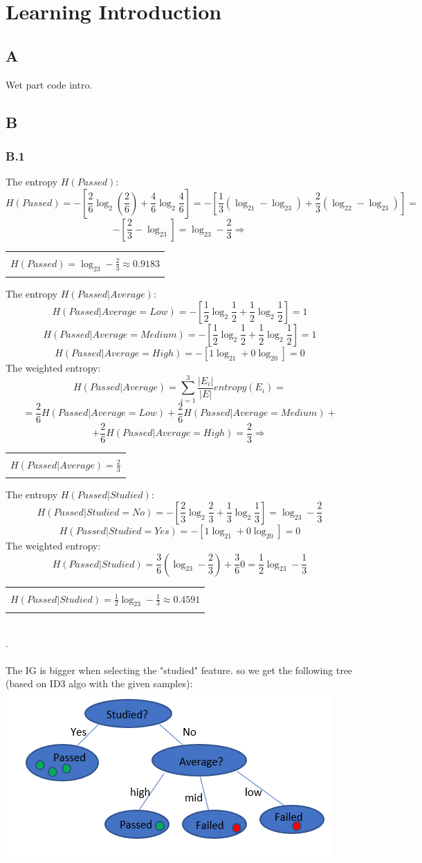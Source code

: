 \documentclass[12pt]{article}
\newcommand{\rectres}[1]{
\begin{center}
\begin{tabular}{ |c| }
\hline\\
#1\\
\\
\hline
\end{tabular}
\end{center}
}
\begin{document}
\section*{Learning Introduction}

\subsection*{A}
Wet part code intro.

\subsection*{B}
\subsubsection*{B.1}
The entropy $H(Passed)$:
$$H(Passed)= -[\frac{2}{6}\log_2(\frac{2}{6}) + \frac{4}{6}\log_2\frac{4}{6}] = -[\frac{1}{3}(\log_21- \log_23) + \frac{2}{3}(\log_22 - \log_23)]=$$ 
$$-[\frac{2}{3} - \log_23] = \log_23 - \frac{2}{3} \Rightarrow$$
\rectres{$H(Passed)=\log_23 - \frac{2}{3} \approx 0.9183$}
The entropy $H(Passed|Average)$:
$$H(Passed|Average=Low)= -[\frac{1}{2}\log_2\frac{1}{2} +\frac{1}{2}\log_2\frac{1}{2}] = 1$$ 
$$H(Passed|Average=Medium)= -[\frac{1}{2}\log_2\frac{1}{2} +\frac{1}{2}\log_2\frac{1}{2}] = 1$$ 
$$H(Passed|Average=High)= -[1\log_21 + 0\log_20] = 0$$ 
The weighted entropy:
$$H(Passed|Average)=\sum_{i=1}^3\frac{|E_i|}{|E|}entropy(E_i)=$$ $$=\frac{2}{6}H(Passed|Average=Low) + \frac{2}{6}H(Passed|Average=Medium)+$$
$$+\frac{2}{6}H(Passed|Average=High)=\frac{2}{3}\Rightarrow$$
\rectres{$H(Passed|Average)=\frac{2}{3}$}
The entropy $H(Passed|Studied)$:
$$H(Passed|Studied=No)= -[\frac{2}{3}\log_2\frac{2}{3} +\frac{1}{3}\log_2\frac{1}{3}] = \log_23 - \frac{2}{3}$$ 
$$H(Passed|Studied=Yes)= -[1\log_21 + 0\log_20] = 0$$ 
The weighted entropy:
$$H(Passed|Studied)=\frac{3}{6}(\log_23 - \frac{2}{3}) + \frac{3}{6}0= \frac{1}{2}\log_23 - \frac{1}{3}$$ 
\rectres{$H(Passed|Studied)=\frac{1}{2}\log_23 - \frac{1}{3} \approx 0.4591$}
\newpage\\
.\\
\\
The IG is bigger when selecting the "studied" feature. so we get the following tree (based on ID3 algo with the given samples):\\
\includegraphics[]{hw3/plots/tree.PNG}
\newpage
\end{document}
